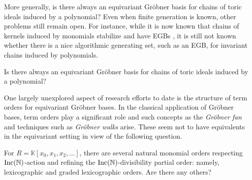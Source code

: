 More generally, is there always an equivariant Gr\"obner basis for chains of toric ideals induced by a polynomial?
Even when finite generation is known, other problems still remain open.  For instance, while it is now known that chains of kernels induced by monomials stabilize \cite{aschenbrenner2007finite, KKL:equivariant-markov, draisma2013noetherianity} and have EGBs \cite{Krone:egb-toric}, it is still not known whether there is a nice algorithmic generating set, such as an EGB, for invariant chains induced by polynomials.

\begin{question}
Is there always an equivariant Gr\"obner basis for chains of toric ideals induced by a polynomial?
\end{question}

One largely unexplored aspect of research efforts to date is the structure of term orders for equivariant Gr\"obner bases.  In the classical application of Gr\"obner bases, term orders play a significant role and such concepts as the \emph{Gr\"obner fan} and techniques such as \emph{Gr\"obner walks} arise. These seem not to have equivalents in the equivariant setting in view of the following question.  

\begin{question} For $R = \mathbb K[x_0,x_1,x_2,\ldots]$, there are several natural monomial orders respecting $\operatorname{Inc}(\mathbb N)$-action and refining the $\operatorname{Inc}(\mathbb N)$-divisibility partial order: namely, lexicographic and graded lexicographic orders.  Are there any others?
\end{question}



